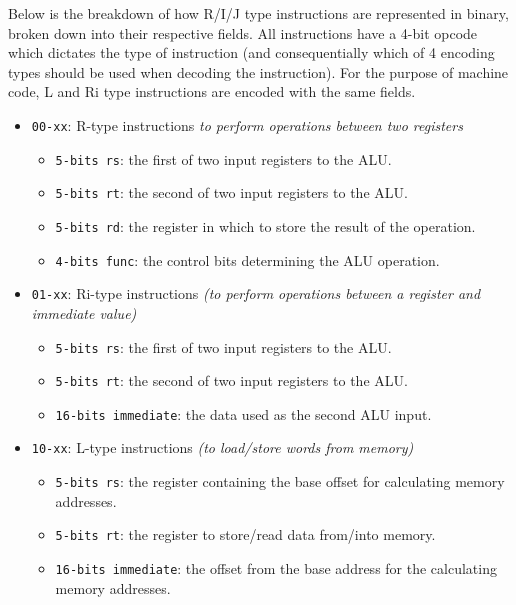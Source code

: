 \label{sec:MachineCodeEncoding}
Below is the breakdown of how R/I/J type instructions are represented in binary, broken down into their respective fields. All instructions have a 4-bit opcode which dictates the type of instruction (and consequentially which of 4 encoding types should be used when decoding the instruction). For the purpose of machine code, L and Ri type instructions are encoded with the same fields.

\begin{itemize}
    \item \texttt{00-xx}: R-type instructions \textit{to perform operations between two registers}
        \begin{itemize}
            \item \texttt{5-bits rs}: the first of two input registers to the ALU.
            \item \texttt{5-bits rt}: the second of two input registers to the ALU.
            \item \texttt{5-bits rd}: the register in  which to store the result of the operation.
            \item \texttt{4-bits func}: the control bits determining the ALU operation.
        \end{itemize}
    \item \texttt{01-xx}: Ri-type instructions \textit{(to perform operations between a register and immediate value)}
        \begin{itemize}
            \item \texttt{5-bits rs}: the first of two input registers to the ALU.
            \item \texttt{5-bits rt}: the second of two input registers to the ALU.
            \item \texttt{16-bits immediate}: the data used as the second ALU input.
        \end{itemize}
    \item \texttt{10-xx}: L-type instructions \textit{(to load/store words from memory)}
        \begin{itemize}
            \item \texttt{5-bits rs}: the register containing the base offset for calculating memory addresses.
            \item \texttt{5-bits rt}: the register to store/read data from/into memory.
            \item \texttt{16-bits immediate}: the offset from the base address for the calculating memory addresses.

\end{itemize}
\end{itemize}
